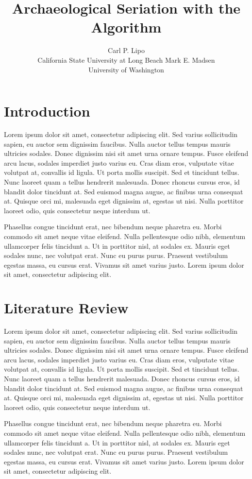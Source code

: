 \documentclass[article]{jss}
\author{Carl P. Lipo\\California State University at Long Beach \And 
        Mark E. Madsen\\University of Washington}
\title{Archaeological Seriation with the \pkg{IDSS} Algorithm}
\begin{document}
\section{Introduction}\label{introduction}

Lorem ipsum dolor sit amet, consectetur adipiscing elit. Sed varius
sollicitudin sapien, eu auctor sem dignissim faucibus. Nulla auctor
tellus tempus mauris ultricies sodales. Donec dignissim nisi sit amet
urna ornare tempus. Fusce eleifend arcu lacus, sodales imperdiet justo
varius eu. Cras diam eros, vulputate vitae volutpat at, convallis id
ligula. Ut porta mollis suscipit. Sed et tincidunt tellus. Nunc laoreet
quam a tellus hendrerit malesuada. Donec rhoncus cursus eros, id blandit
dolor tincidunt at. Sed euismod magna augue, ac finibus urna consequat
at. Quisque orci mi, malesuada eget dignissim at, egestas ut nisi. Nulla
porttitor laoreet odio, quis consectetur neque interdum ut.

Phasellus congue tincidunt erat, nec bibendum neque pharetra eu. Morbi
commodo sit amet neque vitae eleifend. Nulla pellentesque odio nibh,
elementum ullamcorper felis tincidunt a. Ut in porttitor nisl, at
sodales ex. Mauris eget sodales nunc, nec volutpat erat. Nunc eu purus
purus. Praesent vestibulum egestas massa, eu cursus erat. Vivamus sit
amet varius justo. Lorem ipsum dolor sit amet, consectetur adipiscing
elit.

\section{Literature Review}\label{literature-review}

Lorem ipsum dolor sit amet, consectetur adipiscing elit. Sed varius
sollicitudin sapien, eu auctor sem dignissim faucibus. Nulla auctor
tellus tempus mauris ultricies sodales. Donec dignissim nisi sit amet
urna ornare tempus. Fusce eleifend arcu lacus, sodales imperdiet justo
varius eu. Cras diam eros, vulputate vitae volutpat at, convallis id
ligula. Ut porta mollis suscipit. Sed et tincidunt tellus. Nunc laoreet
quam a tellus hendrerit malesuada. Donec rhoncus cursus eros, id blandit
dolor tincidunt at. Sed euismod magna augue, ac finibus urna consequat
at. Quisque orci mi, malesuada eget dignissim at, egestas ut nisi. Nulla
porttitor laoreet odio, quis consectetur neque interdum ut.

Phasellus congue tincidunt erat, nec bibendum neque pharetra eu. Morbi
commodo sit amet neque vitae eleifend. Nulla pellentesque odio nibh,
elementum ullamcorper felis tincidunt a. Ut in porttitor nisl, at
sodales ex. Mauris eget sodales nunc, nec volutpat erat. Nunc eu purus
purus. Praesent vestibulum egestas massa, eu cursus erat. Vivamus sit
amet varius justo. Lorem ipsum dolor sit amet, consectetur adipiscing
elit.
\end{document}
